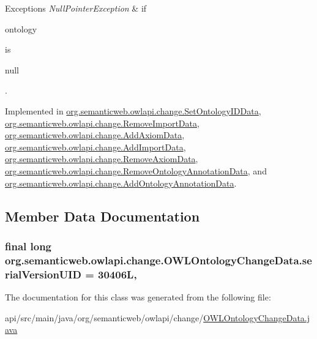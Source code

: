 \begin{DoxyExceptions}{Exceptions}
{\em Null\-Pointer\-Exception} & if
\begin{DoxyCode}
ontology 
\end{DoxyCode}
 is
\begin{DoxyCode}
null 
\end{DoxyCode}
 . \\
\hline
\end{DoxyExceptions}


Implemented in \hyperlink{classorg_1_1semanticweb_1_1owlapi_1_1change_1_1_set_ontology_i_d_data_a685028e38adb58497de9d3b48c4264bb}{org.\-semanticweb.\-owlapi.\-change.\-Set\-Ontology\-I\-D\-Data}, \hyperlink{classorg_1_1semanticweb_1_1owlapi_1_1change_1_1_remove_import_data_a571e3b60f3978bb2bb93824eecce6b5f}{org.\-semanticweb.\-owlapi.\-change.\-Remove\-Import\-Data}, \hyperlink{classorg_1_1semanticweb_1_1owlapi_1_1change_1_1_add_axiom_data_af73a290cc6115cc6da0bdec39f0af58a}{org.\-semanticweb.\-owlapi.\-change.\-Add\-Axiom\-Data}, \hyperlink{classorg_1_1semanticweb_1_1owlapi_1_1change_1_1_add_import_data_a5e0aa81eeae6a3b23ead63c0e1f8c5f5}{org.\-semanticweb.\-owlapi.\-change.\-Add\-Import\-Data}, \hyperlink{classorg_1_1semanticweb_1_1owlapi_1_1change_1_1_remove_axiom_data_abca7c3b473cae93966a051f4fa3e6d75}{org.\-semanticweb.\-owlapi.\-change.\-Remove\-Axiom\-Data}, \hyperlink{classorg_1_1semanticweb_1_1owlapi_1_1change_1_1_remove_ontology_annotation_data_a11fa319404040e3c0e42c00467bff09b}{org.\-semanticweb.\-owlapi.\-change.\-Remove\-Ontology\-Annotation\-Data}, and \hyperlink{classorg_1_1semanticweb_1_1owlapi_1_1change_1_1_add_ontology_annotation_data_a4da49bb1ba2e4a76eb56c08af88ada17}{org.\-semanticweb.\-owlapi.\-change.\-Add\-Ontology\-Annotation\-Data}.



\subsection{Member Data Documentation}
\hypertarget{classorg_1_1semanticweb_1_1owlapi_1_1change_1_1_o_w_l_ontology_change_data_aa21d0ac73193ff5f768f4302dae0024e}{
\subsubsection[{serial\-Version\-U\-I\-D}]{\setlength{\rightskip}{0pt plus 5cm}final long org.\-semanticweb.\-owlapi.\-change.\-O\-W\-L\-Ontology\-Change\-Data.\-serial\-Version\-U\-I\-D = 30406\-L\hspace{0.3cm}{\ttfamily [static]}, {\ttfamily [private]}}}\label{classorg_1_1semanticweb_1_1owlapi_1_1change_1_1_o_w_l_ontology_change_data_aa21d0ac73193ff5f768f4302dae0024e}


The documentation for this class was generated from the following file\-:\begin{DoxyCompactItemize}
\item 
api/src/main/java/org/semanticweb/owlapi/change/\hyperlink{_o_w_l_ontology_change_data_8java}{O\-W\-L\-Ontology\-Change\-Data.\-java}\end{DoxyCompactItemize}
